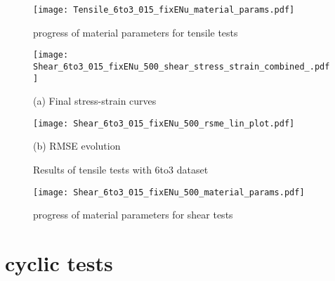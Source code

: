     \begin{figure}[H]
		\centering
        \texttt{[image: Tensile\_6to3\_015\_fixENu\_material\_params.pdf]}
		\caption{progress of material parameters for tensile tests}
		\label{fig:tensileMatParams}
	\end{figure}

    \begin{figure}[H]
        \centering
        \begin{minipage}[t]{0.495\textwidth}
            \centering
            \texttt{[image: Shear\_6to3\_015\_fixENu\_500\_shear\_stress\_strain\_combined\_.pdf]}
            \caption*{(a) Final stress-strain curves}
            \label{fig:shearStressStrain6to3}
        \end{minipage}
        \hfill
        \begin{minipage}[t]{0.495\textwidth}
            \centering
            \texttt{[image: Shear\_6to3\_015\_fixENu\_500\_rsme\_lin\_plot.pdf]}
            \caption*{(b) RMSE evolution}
            \label{subfigure:shearRMSE}
        \end{minipage}
        \caption{Results of tensile tests with 6to3 dataset}
        \label{fig:shearResults6to3}
    \end{figure}


    \begin{figure}[H]
		\centering
        \texttt{[image: Shear\_6to3\_015\_fixENu\_500\_material\_params.pdf]}
		\caption{progress of material parameters for shear tests}
		\label{fig:shearMatParams}
	\end{figure}


    \section{cyclic tests}







	